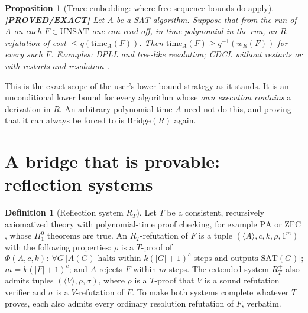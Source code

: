 \documentclass[11pt]{article}
\newtheorem{proposition}[theorem]{Proposition}
\theoremstyle{definition}
\newtheorem{definition}[theorem]{Definition}
\theoremstyle{remark}
\newcommand{\SAT}{\mathrm{SAT}}
\newcommand{\UNSAT}{\mathrm{UNSAT}}
\newcommand{\status}[1]{\textbf{[#1]}}
\begin{document}
\begin{proposition}[Trace-embedding: where free-sequence bounds do apply]\label{prop:trace}
\status{PROVED/EXACT} Let $A$ be a SAT algorithm. Suppose that from the run of $A$
on each $F\in\UNSAT$ one can read off, in time polynomial in the run, an
$R$-refutation of cost $\le q(\mathrm{time}_A(F))$. Then
$\mathrm{time}_A(F)\ge q^{-1}(w_R(F))$ for every such $F$. Examples: DPLL and
tree-like resolution; CDCL without restarts or with restarts and resolution
\cite{bks2004,pipatsrisawatdarwiche2011}.
\end{proposition}

This is the exact scope of the user's lower-bound strategy as it stands. It is
an unconditional lower bound for every algorithm whose \emph{own execution
contains} a derivation in $R$. An arbitrary polynomial-time $A$ need not do
this, and proving that it can always be forced to is $\mathrm{Bridge}(R)$ again.

\section{A bridge that is provable: reflection systems}

\begin{definition}[Reflection system $R_T$]
Let $T$ be a consistent, recursively axiomatized theory with polynomial-time
proof checking, for example $\mathrm{PA}$ or $\mathrm{ZFC}$, whose
$\Pi^0_1$ theorems are true. An $R_T$-refutation of $F$ is a tuple
$(\langle A\rangle,c,k,\rho,1^{m})$ with the following properties:
$\rho$ is a $T$-proof of
\[
 \Phi(A,c,k):\ \forall G\ \bigl[A(G)\text{ halts within }k(|G|+1)^c\text{ steps
 and outputs }\SAT(G)\bigr];
\]
$m=k(|F|+1)^c$; and $A$ rejects $F$ within $m$ steps. The extended system
$R_T^{+}$ also admits tuples $(\langle V\rangle,\rho,\sigma)$, where $\rho$ is a
$T$-proof that $V$ is a sound refutation verifier and $\sigma$ is a
$V$-refutation of $F$. To make both systems complete whatever $T$ proves,
each also admits every ordinary resolution refutation of $F$, verbatim.
\end{definition}
\end{document}
